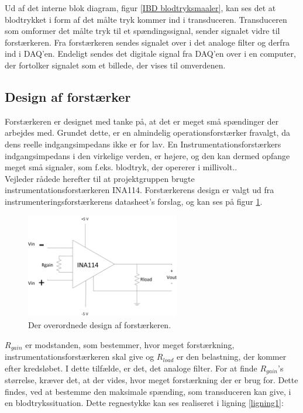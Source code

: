 Ud af det interne blok diagram, figur \ref{IBD blodtryksmaaler}, kan ses det at blodtrykket i form af det målte tryk kommer ind i transduceren. Transduceren som omformer det målte tryk til et spændingssignal, sender signalet vidre til forstærkeren. Fra forstærkeren sendes signalet over i det analoge filter og derfra ind i DAQ'en. Endeligt sendes det digitale signal fra DAQ'en over i en computer, der fortolker signalet som et billede, der vises til omverdenen.

\subsection{Design af forstærker}
Forstærkeren er designet med tanke på, at det er meget små spændinger der arbejdes med. Grundet dette, er en almindelig operationsforstærker fravalgt, da dens reelle indgangsimpedans ikke er for lav. En Instrumentationsforstærkers indgangsimpedans i den virkelige verden, er højere, og den kan dermed opfange meget små signaler, som f.eks. blodtryk, der opererer i millivolt..\\
Vejleder rådede herefter til at projektgruppen brugte instrumentationsforstærkeren INA114. Forstærkerens design er valgt ud fra instrumenteringsforstærkerens datasheet’s forslag, og kan ses på figur \ref{labelpic}.\\ 
\begin{figure}[H]
	\centering
	\includegraphics[width=0.6\textwidth]{Figurer/Hardware/Forstaerker}
	\caption{Der overordnede design af forstærkeren.}\label{labelpic}
\end{figure}



$R_{gain}$ er modstanden, som bestemmer, hvor meget forstærkning, instrumentationsforstærkeren skal give og $R_{load}$ er den belastning, der kommer efter kredsløbet. I dette tilfælde, er det, det analoge filter. For at finde $R_{gain}$’s størrelse, kræver det, at der vides, hvor meget forstærkning der er brug for. Dette findes, ved at bestemme den maksimale spænding, som transduceren kan give, i en blodtrykssituation. Dette regnestykke kan ses realiseret i ligning \ref{ligning1}:

